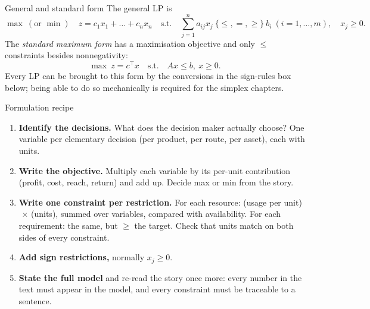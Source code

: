 \begin{rulebox}{General and standard form}
The general LP is
\[
  \max\ (\text{or } \min)\quad z=c_1x_1+\dots+c_nx_n
  \quad\text{s.t.}\quad
  \sum_{j=1}^{n} a_{ij}x_j\ \{\le,=,\ge\}\ b_i\ (i=1,\dots,m),
  \quad x_j\ge 0 .
\]
The \emph{standard maximum form} has a maximisation objective and only
$\le$ constraints besides nonnegativity:
\[
  \max\ z=c^{\top}x \quad\text{s.t.}\quad Ax\le b,\ x\ge 0 .
\]
Every LP can be brought to this form by the conversions in the sign-rules
box below; being able to do so mechanically is required for the simplex
chapters.
\end{rulebox}

\begin{rulebox}{Formulation recipe}
\begin{enumerate}[leftmargin=1.8em,itemsep=0.3ex]
  \item \textbf{Identify the decisions.} What does the decision maker
        actually choose? One variable per elementary decision (per product,
        per route, per asset), each with units.
  \item \textbf{Write the objective.} Multiply each variable by its per-unit
        contribution (profit, cost, reach, return) and add up. Decide max
        or min from the story.
  \item \textbf{Write one constraint per restriction.} For each resource:
        (usage per unit)$\,\times\,$(units), summed over variables,
        compared with availability. For each requirement: the same, but
        $\ge$ the target. Check that units match on both sides of every
        constraint.
  \item \textbf{Add sign restrictions,} normally $x_j\ge 0$.
  \item \textbf{State the full model} and re-read the story once more:
        every number in the text must appear in the model, and every
        constraint must be traceable to a sentence.
\end{enumerate}
\end{rulebox}

